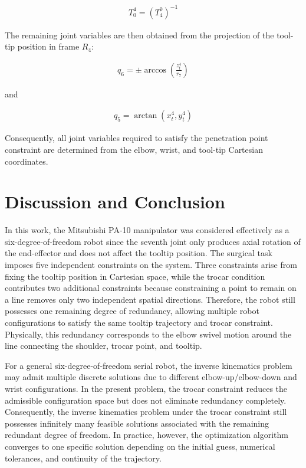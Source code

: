 \documentclass[12pt, a4paper]{article}
\begin{document}
\begin{align}
T_0^{4} = (T_4^{0})^{-1}
\end{align}

The remaining joint variables are then obtained from the projection of the tool-tip position in frame \(R_4\):

\begin{align}
q_6 = \pm \arccos\left(\frac{z_t^{4}}{r_7}\right)
\end{align}

and

\begin{align}
q_5 = \arctan\left({x_t^{4}}, {y_t^{4}}\right)
\end{align}

Consequently, all joint variables required to satisfy the penetration point constraint are determined from the elbow, wrist, and tool-tip Cartesian coordinates.

\section{Discussion and Conclusion}
In this work, the Mitsubishi PA-10 manipulator was considered effectively as a six-degree-of-freedom robot since the seventh joint only produces axial rotation of the end-effector and does not affect the tooltip position. The surgical task imposes five independent constraints on the system. Three constraints arise from fixing the tooltip position in Cartesian space, while the trocar condition contributes two additional constraints because constraining a point to remain on a line removes only two independent spatial directions. Therefore, the robot still possesses one remaining degree of redundancy, allowing multiple robot configurations to satisfy the same tooltip trajectory and trocar constraint. Physically, this redundancy corresponds to the elbow swivel motion around the line connecting the shoulder, trocar point, and tooltip.

For a general six-degree-of-freedom serial robot, the inverse kinematics problem may admit multiple discrete solutions due to different elbow-up/elbow-down and wrist configurations. In the present problem, the trocar constraint reduces the admissible configuration space but does not eliminate redundancy completely. Consequently, the inverse kinematics problem under the trocar constraint still possesses infinitely many feasible solutions associated with the remaining redundant degree of freedom. In practice, however, the optimization algorithm converges to one specific solution depending on the initial guess, numerical tolerances, and continuity of the trajectory.
\end{document}
